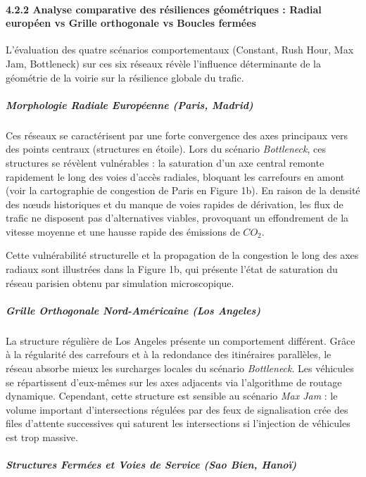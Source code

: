 \documentclass[10pt, a4paper]{article}
\begin{document}
\paragraph{4.2.2 Analyse comparative des résiliences géométriques :
Radial européen vs Grille orthogonale vs Boucles
fermées}\label{analyse-comparative-des-ruxe9siliences-guxe9omuxe9triques-radial-europuxe9en-vs-grille-orthogonale-vs-boucles-fermuxe9es}

L'évaluation des quatre scénarios comportementaux (Constant, Rush Hour,
Max Jam, Bottleneck) sur ces six réseaux révèle l'influence déterminante
de la géométrie de la voirie sur la résilience globale du trafic.

\subparagraph{Morphologie Radiale Européenne (Paris,
Madrid)}\label{morphologie-radiale-europuxe9enne-paris-madrid}

Ces réseaux se caractérisent par une forte convergence des axes
principaux vers des points centraux (structures en étoile). Lors du
scénario \emph{Bottleneck}, ces structures se révèlent vulnérables : la
saturation d'un axe central remonte rapidement le long des voies d'accès
radiales, bloquant les carrefours en amont (voir la cartographie de
congestion de Paris en Figure 1b). En raison de la densité des nœuds
historiques et du manque de voies rapides de dérivation, les flux de
trafic ne disposent pas d'alternatives viables, provoquant un
effondrement de la vitesse moyenne et une hausse rapide des émissions de
\(CO_2\).

Cette vulnérabilité structurelle et la propagation de la congestion le
long des axes radiaux sont illustrées dans la Figure 1b, qui présente
l'état de saturation du réseau parisien obtenu par simulation
microscopique.

\subparagraph{Grille Orthogonale Nord-Américaine (Los
Angeles)}\label{grille-orthogonale-nord-amuxe9ricaine-los-angeles}

La structure régulière de Los Angeles présente un comportement
différent. Grâce à la régularité des carrefours et à la redondance des
itinéraires parallèles, le réseau absorbe mieux les surcharges locales
du scénario \emph{Bottleneck}. Les véhicules se répartissent d'eux-mêmes
sur les axes adjacents via l'algorithme de routage dynamique. Cependant,
cette structure est sensible au scénario \emph{Max Jam} : le volume
important d'intersections régulées par des feux de signalisation crée
des files d'attente successives qui saturent les intersections si
l'injection de véhicules est trop massive.

\subparagraph{Structures Fermées et Voies de Service (Sao Bien,
Hanoï)}\label{structures-fermuxe9es-et-voies-de-service-sao-bien-hanouxef}
\end{document}
